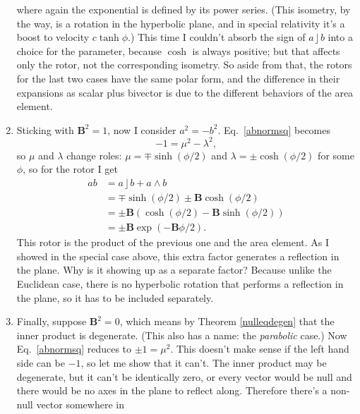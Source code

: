 \documentclass{utarticle}
\newcommand{\bl}[1]{\ensuremath{\bm{#1}}}
\DeclareMathOperator{\lin}{\rfloor}
\DeclareMathOperator{\out}{\wedge}
\begin{document}
\begin{enumerate}
          where again the exponential is defined by its power series.  (This isometry, by the way, is a rotation 
          in the hyperbolic plane, and in special relativity it's a boost to velocity $c\tanh\phi$.)  This time I couldn't 
          absorb the sign of $a \lin b$ into a choice for the parameter, because $\cosh$ is always positive; but 
          that affects only the rotor, not the corresponding isometry.  So aside from that, the rotors for the last two 
          cases have the same polar form, and the difference in their expansions as scalar plus bivector is due to the 
          different behaviors of the area element.  
\item Sticking with $\bl{B}^2=1$, now I consider $a^2=-b^2$.  Eq.~\eqref{abnormsq} becomes
          \begin{equation} {-1} = \mu^2 - \lambda^2, \end{equation}
          so $\mu$ and $\lambda$ change roles: $\mu = \mp\sinh(\phi/2)$ and $\lambda = \pm\cosh(\phi/2)$ for 
          some $\phi$, so for the rotor I get 
          \begin{align} 
          ab & = a \lin b + a \out b \nonumber \\
                & = \mp\sinh(\phi/2) \pm \bl{B} \cosh(\phi/2) \nonumber \\
                & = \pm\bl{B} \left( \cosh(\phi/2) - \bl{B}\sinh(\phi/2)\right) \nonumber \\
                & = \pm\bl{B} \exp\left(-\bl{B} \phi/2\right).
          \end{align}
          This rotor is the product of the previous one and the area element.  As I showed in the special case 
          above, this extra factor generates a reflection in the plane.  Why is it showing up as a separate factor?  
          Because unlike the Euclidean case, there is no hyperbolic rotation that performs a reflection in the 
          plane, so it has to be included separately.  
\item Finally, suppose $\bl{B}^2 = 0$, which means by Theorem \ref{nulleqdegen} that the inner product is 
          degenerate.  (This also has a name: the \emph{parabolic} case.)  Now Eq.~\eqref{abnormsq} reduces
          to $\pm1 = \mu^2$.  This doesn't make sense if the left hand side can be $-1$, so let me show that it can't.
          The inner product may be degenerate, but it can't be identically zero, or every vector would be null and 
          there would be no axes in the plane to reflect along.  Therefore there's a non-null vector somewhere in 

\end{enumerate}
\end{document}

